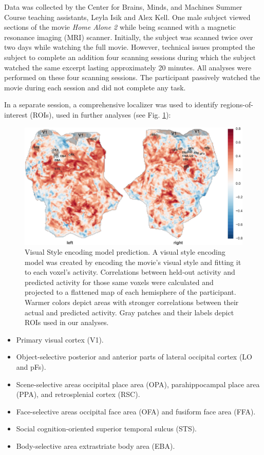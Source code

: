 \documentclass[10pt,twocolumn,letterpaper]{article}
\begin{document}
Data was collected by the Center for Brains, Minds, and Machines Summer Course teaching assistants, Leyla Isik and Alex Kell. One male subject viewed sections of the movie \textit{Home Alone 2} while being scanned with a magnetic resonance imaging (MRI) scanner. Initially, the subject was scanned twice over two days while watching the full movie. However, technical issues prompted the subject to complete an addition four scanning sessions during which the subject watched the same excerpt lasting approximately 20 minutes. All analyses were performed on these four scanning sessions. The participant passively watched the movie during each session and did not complete any task.

In a separate session, a comprehensive localizer was used to identify regions-of-interest (ROIs), used in further analyses (see Fig. \ref{fig:preds-rois}):

\begin{figure}
\begin{center}
\includegraphics[width=0.8\linewidth]{preds_rois.png}
\end{center}
   \caption{Visual Style encoding model prediction. A visual style encoding model was created by encoding the movie's visual style and fitting it to each voxel's activity. Correlations between held-out activity and predicted activity for those same voxels were calculated and projected to a flattened map of each hemisphere of the participant. Warmer colors depict areas with stronger correlations between their actual and predicted activity. Gray patches and their labels depict ROIs used in our analyses.}
\label{fig:preds-rois}
\end{figure}

\begin{itemize}
\item Primary visual cortex (V1).
\item Object-selective posterior and anterior parts of lateral occipital cortex (LO and pFs).
\item Scene-selective areas occipital place area (OPA), parahippocampal place area (PPA), and retrosplenial cortex (RSC).
\item Face-selective areas occipital face area (OFA) and fusiform face area (FFA).
\item Social cognition-oriented superior temporal sulcus (STS).
\item Body-selective area extrastriate body area (EBA).
\end{itemize}
\end{document}
